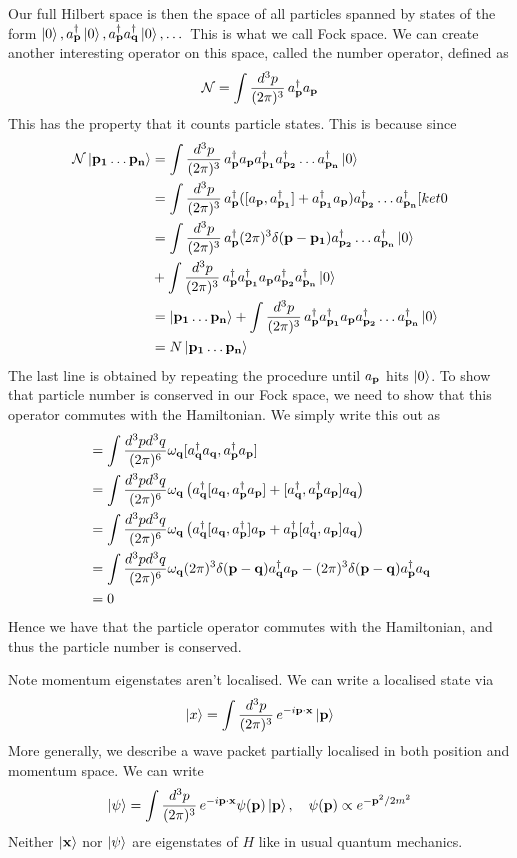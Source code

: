 Our full Hilbert space is then the space of all particles spanned by states of the form $\ket{ 0 }, a^\dagger_{ \mathbf{ p }} \ket{ 0 }, a^\dagger_{ \mathbf{  p  }} a^\dagger_{ \mathbf{  q }} \ket{ 0 }, \dots $ This is what we call Fock space. We can create another interesting operator on this space, called the number operator, defined as
\[ 
\mathcal{ N }  = \int \frac{ d^3 p }{ (2 \pi)^3 } \, a^\dagger_{ \mathbf{  p }} a_{ \mathbf{  p }} 
\] This has the property that it counts particle states. This is because since 
\begin{align*} 
\mathcal { N } \ket{ \mathbf{ p_1 } \dots \mathbf{ p_n } }  & = \int \frac{ d^3 p }{ (2 \pi)^3 } \, a^\dagger_{ \mathbf{  p }} a_{ \mathbf{ p }} a^\dagger_{ \mathbf{ p_1 }} a^\dagger_{ \mathbf{ p_2 }} \dots a^\dagger_{ \mathbf{  p_n  }} \ket{ 0} \\
&= \int \frac{ d^3 p }{ (2 \pi)^3 } \, a^\dagger_{ \mathbf{  p }} ( [ a_{ \mathbf{  p }} , a^\dagger_{ \mathbf{ p_1 }} ] + a^\dagger_{ \mathbf{ p_1 }} a_{ \mathbf{  p }} ) a^\dagger_{ \mathbf{ p_2 }} \dots a^\dagger_{ \mathbf{ p_n }} [ket{ 0} \\
&= \int \frac{ d^3 p }{ (2 \pi)^3 } \, a^\dagger_{ \mathbf{  p }} ( 2\pi )^3 \delta ( \mathbf{  p - p_1 } ) a^\dagger_{ \mathbf{ p_2 }} \dots a^\dagger_{ \mathbf{ p_n }} \ket{0} \\
& + \int \frac{ d^3 p }{ (2 \pi)^3 } \, a^\dagger_{ \mathbf{  p }} a^\dagger_{ \mathbf{  p_1 }} a_{ \mathbf{ p }}  a^\dagger_{ \mathbf{ p_2 }} a^\dagger_{ \mathbf{ p_n }} \ket{ 0} \\
&= \ket{ \mathbf{ p_1 } \dots \mathbf{ p_n } } + \int \frac{ d^3 p }{ (2 \pi)^3 } \, a^\dagger_{ \mathbf{  p }} a^\dagger_{ \mathbf{  p_1 }} a_{ \mathbf{ p  }} a^\dagger_{ \mathbf{  p_2 }} \dots a^\dagger_{ \mathbf{  p_n }} \ket{ 0 } \\
&= N \ket{ \mathbf{ p_1 } \dots \mathbf{ p_n } } 
\end{align*} 
The last line is obtained by repeating the procedure until $a_{ \mathbf{ p  }}$ hits $\ket{ 0}$. 
To show that particle number is conserved in our Fock space, we need to show that this operator commutes with the Hamiltonian. We simply write this out as 
\begin{align*} 
[ H , \mathcal{ N } ] &= \int \frac{ d^3 p d^3 q }{ ( 2 \pi )^6} \freq{q} [ \crea{ q} \ann{q} , \crea{ p} \ann{ p} ] \\
	&=  \int \frac{ d^3 p d^3 q }{ ( 2 \pi )^6} \freq{q} \left( \crea{ q} [ \ann{q}, \crea{ p} \ann{ p} ] + [ \crea{ q}, \crea{ p} \ann{ p } ] \ann{ q} \right)  \\
	&= \int \frac{ d^3 p d^3 q }{ ( 2 \pi )^6} \freq{q} \left( \crea{ q} [ \ann{ q}, \crea{ p } ] \ann{ p} + \crea{ p} [ \crea{ q} , \ann{p} ] \ann{ q}  \right)  \\
&= \int \frac{ d^3 p d^3 q }{ ( 2 \pi )^6} \freq{q} (2 \pi )^3 \delta ( \ve{ p - q} ) \crea{ q} \ann{ p } - (2 \pi )^3 \delta ( \ve{ p - q} ) \crea{ p} \ann{ q} \\
& = 0 
\end{align*} 
Hence we have that the particle operator commutes with the Hamiltonian, and thus the particle number is conserved. 

Note momentum eigenstates aren't localised. We can write a localised state via 
\[ 
\ket{ x} = \int \frac{ d^3 p }{ (2 \pi)^3 } \, e^{ - i \mathbf{ p  } \cdot \mathbf{x} }  \ket{ \mathbf{  p } } 
\] More generally, we describe a wave packet partially localised in both position and momentum space. We can write 
\[
\ket{ \psi }  = \int \frac{ d^3 p }{ (2 \pi)^3 } \, e^{ - i \mathbf{  p  } \cdot \mathbf{x} } \psi ( \mathbf{  p  } ) \ket{ \mathbf{  p  } } , \quad \psi ( \mathbf{  p  } ) \propto e^{  - \mathbf{  p  }^2 / 2m^  2 }
\] Neither $\ket { \mathbf{  x } } $ nor  $ \ket { \psi } $ are eigenstates of $H$ like in usual quantum mechanics. 


